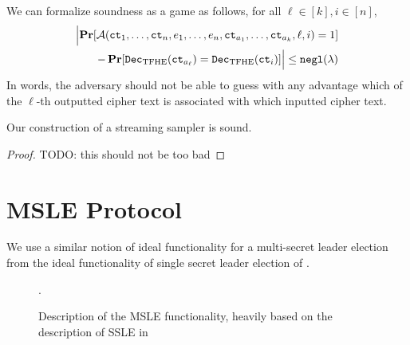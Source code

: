 We can formalize soundness as a game as follows, for all $\ell \in [k], i \in [n]$,
\begin{align}
	\Bigl\lvert 
		\operatorname*{\mathbf{Pr}}[\mathcal{A}(\texttt{ct}_1, \dots, \texttt{ct}_n, e_1, \dots, e_n, \texttt{ct}_{a_1}, \dots, \texttt{ct}_{a_k}, \ell, i) = 1] \\
		- \operatorname*{\mathbf{Pr}}[\texttt{Dec}_{\mathrm{TFHE}}(\texttt{ct}_{a_\ell}) = \texttt{Dec}_{\mathrm{TFHE}}(\texttt{ct}_i)]
	\Bigr\rvert \leq \texttt{negl}(\lambda) \notag
\end{align}
In words, the adversary should not be able to guess with any advantage which of the $\ell$-th 
outputted cipher text is associated with which inputted cipher text.

\begin{lemma}
	Our construction of a streaming sampler is sound.
	\begin{proof}
		TODO: this should not be too bad
	\end{proof}
\end{lemma}

\section{MSLE Protocol}
\label{sec:msle_protocol}
We use a similar notion of ideal functionality for a multi-secret leader election from the ideal
functionality of single secret leader election of .

\begin{figure}[ht]
	\centering
	\caption{Description of the MSLE functionality, heavily based on the description of SSLE in }.
	\label{fig:my_label}
\end{figure}

